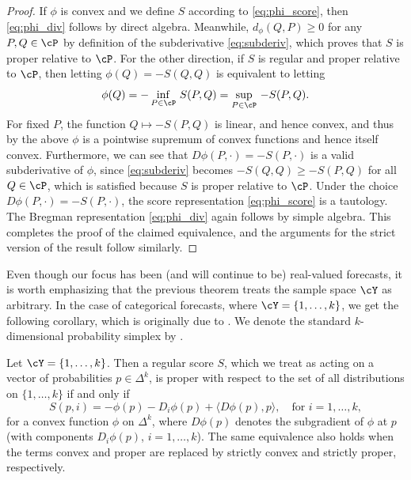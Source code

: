 \documentclass{article}
\begin{document}
\begin{proof}
If $\phi$ is convex and we define $S$ according to \eqref{eq:phi_score}, then
\eqref{eq:phi_div} follows by direct algebra. Meanwhile, $d_\phi(Q, P) \geq 0$
for any $P,Q \in \cP$ by definition of the subderivative \eqref{eq:subderiv},
which proves that $S$ is proper relative to $\cP$. For the other direction, if
$S$ is regular and proper relative to $\cP$, then letting $\phi(Q) = -S(Q, Q)$
is equivalent to letting  
\[
\phi(Q) = -\inf_{P \in \cP} \, S(P, Q) = \sup_{P \in \cP} \, -S(P, Q).
\]
For fixed $P$, the function $Q \mapsto -S(P, Q)$ is linear, and hence convex,
and thus by the above $\phi$ is a pointwise supremum of convex functions and
hence itself convex. Furthermore, we can see that $D\phi(P, \cdot) = -S(P,
\cdot)$ is a valid subderivative of $\phi$, since \eqref{eq:subderiv} becomes 
$-S(Q, Q) \geq -S(P, Q)$ for all $Q \in \cP$, which is satisfied because $S$ is 
proper relative to $\cP$. Under the choice $D\phi(P, \cdot) = -S(P, \cdot)$, the 
score representation \eqref{eq:phi_score} is a tautology. The Bregman
representation \eqref{eq:phi_div} again follows by simple algebra. This
completes the proof of the claimed equivalence, and the arguments for the strict
version of the result follow similarly.
\end{proof}

Even though our focus has been (and will continue to be) real-valued forecasts,
it is worth emphasizing that the previous theorem treats the sample space $\cY$
as arbitrary. In the case of categorical forecasts, where $\cY = \{1,\dots,k\}$,
we get the following corollary, which is originally due to 
\citet{savage1971elicitation}. We denote the standard $k$-dimensional 
probability simplex by .

\begin{corollary}
Let $\cY = \{1,\dots,k\}$. Then a regular score $S$, which we treat as acting on
a vector of probabilities $p \in \Delta^k$, is proper with respect to the set of
all distributions on $\{1,\dots,k\}$ if and only if 
\[
S(p, i) = -\phi(p) - D_i\phi(p) + \langle D\phi(p), p \rangle , \quad \text{for
  $i=1,\dots,k$},
\]
for a convex function $\phi$ on $\Delta^k$, where $D\phi(p)$ denotes the
subgradient of $\phi$ at $p$ (with components $D_i\phi(p)$, $i=1,\dots,k$). The
same equivalence also holds when the terms convex and proper are replaced by
strictly convex and strictly proper, respectively.     
\end{corollary}
\end{document}
